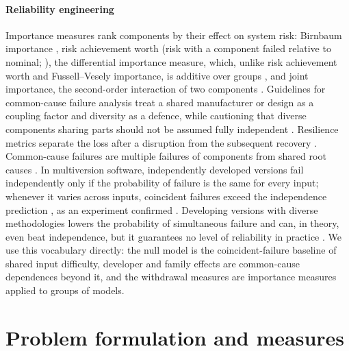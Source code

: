 \documentclass[preprint,12pt,authoryear]{elsarticle}
\begin{document}
\paragraph{Reliability engineering} Importance measures rank components by their effect on system risk: Birnbaum importance \citep{birnbaum1969}, risk achievement worth (risk with a component failed relative to nominal; \citealp{vesely1983}), the differential importance measure, which, unlike risk achievement worth and Fussell--Vesely importance, is additive over groups \citep{borgonovo2001}, and joint importance, the second-order interaction of two components \citep{honglie1993}. Guidelines for common-cause failure analysis treat a shared manufacturer or design as a coupling factor and diversity as a defence, while cautioning that diverse components sharing parts should not be assumed fully independent \citep{mosleh1998ccf}. Resilience metrics separate the loss after a disruption from the subsequent recovery \citep{henry2012,hosseini2016}. Common-cause failures are multiple failures of components from shared root causes \citep{iaea1992ccf}. In multiversion software, independently developed versions fail independently only if the probability of failure is the same for every input; whenever it varies across inputs, coincident failures exceed the independence prediction \citep{eckhardt1985}, as an experiment confirmed \citep{knight1986}. Developing versions with diverse methodologies lowers the probability of simultaneous failure and can, in theory, even beat independence, but it guarantees no level of reliability in practice \citep{littlewood1989}. We use this vocabulary directly: the null model is the coincident-failure baseline of shared input difficulty, developer and family effects are common-cause dependences beyond it, and the withdrawal measures are importance measures applied to groups of models.

\section{Problem formulation and measures}
\end{document}
